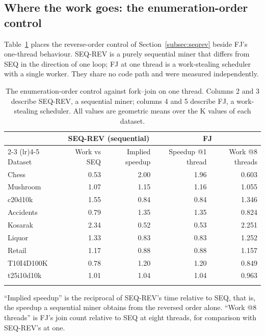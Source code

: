 \documentclass[pdflatex,sn-vancouver-num]{sn-jnl}
\theoremstyle{thmstyleone}%
\theoremstyle{thmstyletwo}%
\theoremstyle{thmstylethree}%
\newcommand{\Kk}{\mathrm{K}}
\begin{document}
\subsection{Where the work goes: the enumeration-order control}\label{subsec:order}
 
Table~\ref{tab:order} places the reverse-order control of
Section~\ref{subsec:seqrev} beside FJ's one-thread behaviour. SEQ-REV is
a purely sequential miner that differs from SEQ in the direction of one
loop; FJ at one thread is a work-stealing scheduler with a single
worker. They share no code path and were measured independently.
 
\begin{table}[t]
\caption{The enumeration-order control against fork--join on one thread.
Columns 2 and 3 describe SEQ-REV, a sequential miner; columns 4 and 5
describe FJ, a work-stealing scheduler. All values are geometric means
over the $\Kk$ values of each dataset.}\label{tab:order}
\footnotesize\setlength{\tabcolsep}{5pt}
\begin{tabular}{@{}lrrrr@{}}
\toprule
& \multicolumn{2}{c}{SEQ-REV (sequential)} & \multicolumn{2}{c}{FJ} \\
\cmidrule(lr){2-3} \cmidrule(lr){4-5}
Dataset & Work vs SEQ & Implied speedup & Speedup @1 thread & Work @8 threads \\
\midrule
Chess      & 0.53 & 2.00 & 1.96 & 0.603 \\
Mushroom   & 1.07 & 1.15 & 1.16 & 1.055 \\
c20d10k    & 1.55 & 0.84 & 0.84 & 1.346 \\
Accidents  & 0.79 & 1.35 & 1.35 & 0.824 \\
Kosarak    & 2.34 & 0.52 & 0.53 & 2.251 \\
Liquor     & 1.33 & 0.83 & 0.83 & 1.252 \\
Retail     & 1.17 & 0.88 & 0.88 & 1.157 \\
T10I4D100K & 0.78 & 1.20 & 1.20 & 0.849 \\
t25i10d10k & 1.01 & 1.04 & 1.04 & 0.963 \\
\botrule
\end{tabular}
\vspace{2pt}
 
{\footnotesize ``Implied speedup'' is the reciprocal of SEQ-REV's time
relative to SEQ, that is, the speedup a sequential miner obtains from the
reversed order alone. ``Work @8 threads'' is FJ's join count relative to
SEQ at eight threads, for comparison with SEQ-REV's at one.}
\end{table}
 
\end{document}
